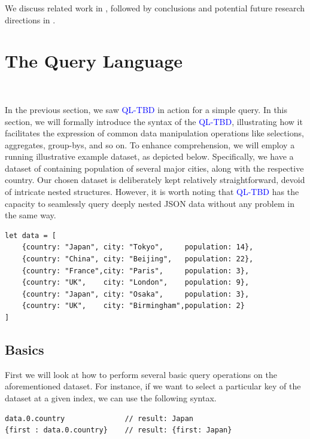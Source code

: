 \documentclass[runningheads]{llncs}
\newcommand{\lang}{\textcolor{blue}{QL-TBD}}
\begin{document}
We discuss related work in , followed by conclusions and potential future research directions
in .


\section{The Query Language}~\label{sec:query_language}

In the previous section, we saw \lang{} in action for a simple query.
In this section, we will formally introduce the syntax of the \lang{}, illustrating how it facilitates
the expression of common data manipulation operations like selections, aggregates,
group-bys, and so on.
To enhance comprehension, we will employ a running illustrative example dataset, as
depicted below.
Specifically, we have a dataset of containing population of several major cities,
along with the respective country.
Our chosen dataset is deliberately kept relatively straightforward, devoid of
intricate nested structures.
However, it is worth noting that \lang{} has the capacity to seamlessly query
deeply nested JSON data without any problem in the same way.


\begin{lstlisting}[style=JavaScript]
let data = [
    {country: "Japan", city: "Tokyo",     population: 14},
    {country: "China", city: "Beijing",   population: 22},
    {country: "France",city: "Paris",     population: 3},
    {country: "UK",    city: "London",    population: 9},
    {country: "Japan", city: "Osaka",     population: 3},
    {country: "UK",    city: "Birmingham",population: 2}
]
\end{lstlisting}


\subsection{Basics}
First we will look at how to perform several basic query operations on the
aforementioned dataset.
For instance, if we want to select a particular key of the dataset at a given
index, we can use the following syntax.

\begin{lstlisting}[style=JavaScript]
data.0.country              // result: Japan
{first : data.0.country}    // result: {first: Japan}
\end{lstlisting}
\end{document}
